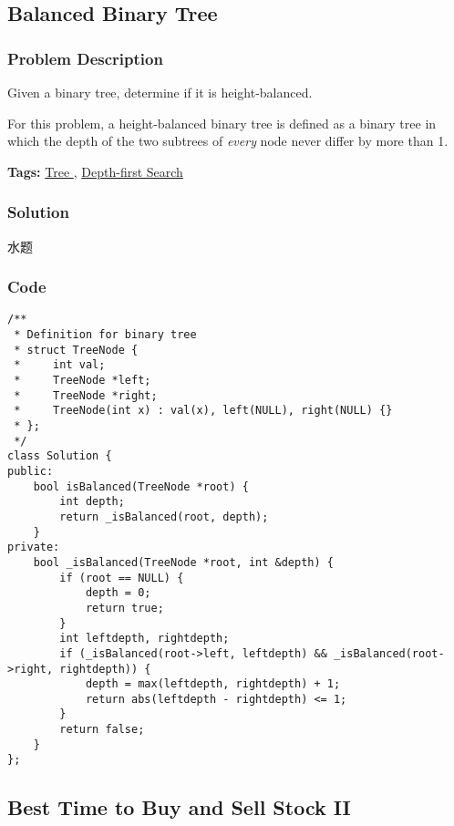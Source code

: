 \documentclass{article}
\begin{document}
\begin{CJK*}{UTF8}{gkai}
\begin{lstlisting}
\end{lstlisting}


\subsection{ Balanced Binary Tree }
\label{ Balanced Binary Tree }

\subsubsection*{Problem Description}
Given a binary tree, determine if it is height-balanced.

For this problem, a height-balanced binary tree is defined as a binary tree in which the depth of the two subtrees of \emph{every} node never differ by more than 1.


\textbf{Tags: }
\hyperref[ Tree ]{ Tree },  \hyperref[ Depth-first Search ]{ Depth-first Search }



\subsubsection*{Solution}
水题

\subsubsection*{Code}
\begin{lstlisting}
/**
 * Definition for binary tree
 * struct TreeNode {
 *     int val;
 *     TreeNode *left;
 *     TreeNode *right;
 *     TreeNode(int x) : val(x), left(NULL), right(NULL) {}
 * };
 */
class Solution {
public:
    bool isBalanced(TreeNode *root) {
        int depth;
        return _isBalanced(root, depth);
    }
private:
    bool _isBalanced(TreeNode *root, int &depth) {
        if (root == NULL) {
            depth = 0;
            return true;
        }
        int leftdepth, rightdepth;
        if (_isBalanced(root->left, leftdepth) && _isBalanced(root->right, rightdepth)) {
            depth = max(leftdepth, rightdepth) + 1;
            return abs(leftdepth - rightdepth) <= 1;
        }
        return false;
    }
}; 
\end{lstlisting}


\subsection{ Best Time to Buy and Sell Stock II }
\label{ Best Time to Buy and Sell Stock II }


\end{CJK*}
\end{document}
